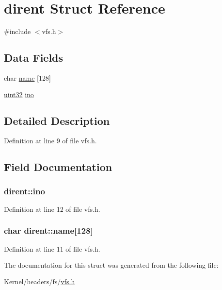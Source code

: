 \hypertarget{structdirent}{
\section{dirent Struct Reference}
\label{structdirent}
}


{\ttfamily \#include $<$vfs.h$>$}

\subsection*{Data Fields}
\begin{DoxyCompactItemize}
\item 
char \hyperlink{structdirent_abb2093f2917192e693a5651c50f555d5}{name} \mbox{[}128\mbox{]}
\item 
\hyperlink{int__types_8h_a1134b580f8da4de94ca6b1de4d37975e}{uint32} \hyperlink{structdirent_a3676c6e41bb76d47324882f770d769a3}{ino}
\end{DoxyCompactItemize}


\subsection{Detailed Description}


Definition at line 9 of file vfs.h.



\subsection{Field Documentation}
\hypertarget{structdirent_a3676c6e41bb76d47324882f770d769a3}{
\subsubsection[{ino}]{ {\bf dirent::ino}}}
\label{structdirent_a3676c6e41bb76d47324882f770d769a3}


Definition at line 12 of file vfs.h.

\hypertarget{structdirent_abb2093f2917192e693a5651c50f555d5}{
\subsubsection[{name}]{\setlength{\rightskip}{0pt plus 5cm}char {\bf dirent::name}\mbox{[}128\mbox{]}}}
\label{structdirent_abb2093f2917192e693a5651c50f555d5}


Definition at line 11 of file vfs.h.



The documentation for this struct was generated from the following file:\begin{DoxyCompactItemize}
\item 
Kernel/headers/fs/\hyperlink{vfs_8h}{vfs.h}\end{DoxyCompactItemize}
